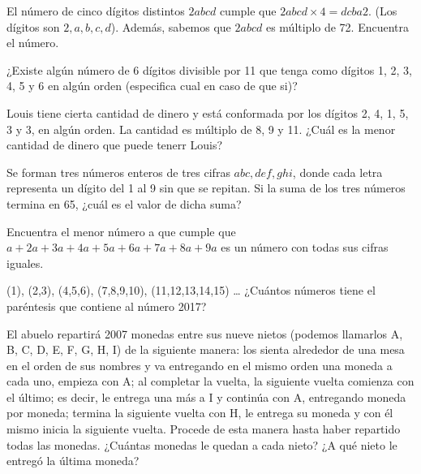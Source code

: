 \begin{problem}[$3 \clubsuit$]
    El número de cinco dígitos distintos \(2abcd\) cumple que 
    \(2abcd \times 4 = dcba2\). (Los dígitos son \(2,a,b,c,d\)). 
    Además, sabemos que \(2abcd\) es múltiplo de 72. 
    Encuentra el número.
\end{problem}

\begin{problem}[$3 \clubsuit$]
    ¿Existe algún número de 6 dígitos divisible por 11 que 
    tenga como dígitos 1, 2, 3, 4, 5 y 6 en algún orden 
    (especifica cual en caso de que si)?
\end{problem}

\begin{problem}[$3 \clubsuit$]
    Louis tiene cierta cantidad de dinero y está conformada por 
    los dígitos 2, 4, 1, 5, 3 y 3, en algún orden. La cantidad es 
    múltiplo de 8, 9 y 11. ¿Cuál es la menor cantidad de dinero 
    que puede tenerr Louis?
\end{problem}

\begin{problem}[$3 \clubsuit$]
    Se forman tres números enteros de tres cifras 
    \(abc,def,ghi\), donde cada letra representa un dígito del 
    1 al 9 sin que se repitan. Si la suma de los tres números 
    termina en 65, ¿cuál es el valor de dicha suma?
\end{problem}

\begin{problem}[$3 \clubsuit$]
    Encuentra el menor número a que cumple que $a + 2a + 3a + 
    4a + 5a + 6a + 7a + 8a + 9a$ es un número con todas sus 
    cifras iguales.
\end{problem}

\begin{problem}[$3 \clubsuit$]
    (1), (2,3), (4,5,6), (7,8,9,10), (11,12,13,14,15) … 
    ¿Cuántos números tiene el paréntesis que contiene al número 
    2017?
\end{problem}

\begin{problem}[$3 \clubsuit$]
    El abuelo repartirá 2007 monedas entre sus nueve nietos 
    (podemos llamarlos A, B, C, D, E, F, G, H, I) de la 
    siguiente manera: los sienta alrededor de una mesa en el 
    orden de sus nombres y va entregando en el mismo orden una 
    moneda a cada uno, empieza con A; al completar la vuelta, la 
    siguiente vuelta comienza con el último; es decir, le 
    entrega una más a I y continúa con A, entregando moneda por 
    moneda; termina la siguiente vuelta con H, le entrega su 
    moneda y con él mismo inicia la siguiente vuelta. Procede de 
    esta manera hasta haber repartido todas las monedas. 
    ¿Cuántas monedas le quedan a cada nieto? ¿A qué nieto le 
    entregó la última moneda?
\end{problem}

